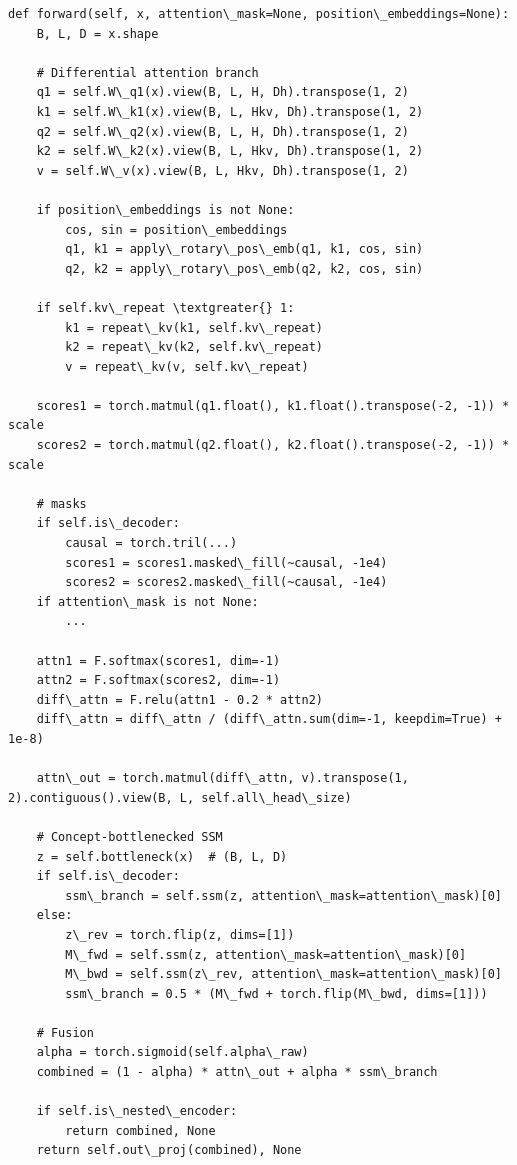 \begin{lstlisting}
def forward(self, x, attention\_mask=None, position\_embeddings=None):
    B, L, D = x.shape
    
    # Differential attention branch
    q1 = self.W\_q1(x).view(B, L, H, Dh).transpose(1, 2)
    k1 = self.W\_k1(x).view(B, L, Hkv, Dh).transpose(1, 2)
    q2 = self.W\_q2(x).view(B, L, H, Dh).transpose(1, 2)
    k2 = self.W\_k2(x).view(B, L, Hkv, Dh).transpose(1, 2)
    v = self.W\_v(x).view(B, L, Hkv, Dh).transpose(1, 2)
    
    if position\_embeddings is not None:
        cos, sin = position\_embeddings
        q1, k1 = apply\_rotary\_pos\_emb(q1, k1, cos, sin)
        q2, k2 = apply\_rotary\_pos\_emb(q2, k2, cos, sin)
    
    if self.kv\_repeat \textgreater{} 1:
        k1 = repeat\_kv(k1, self.kv\_repeat)
        k2 = repeat\_kv(k2, self.kv\_repeat)
        v = repeat\_kv(v, self.kv\_repeat)
    
    scores1 = torch.matmul(q1.float(), k1.float().transpose(-2, -1)) * scale
    scores2 = torch.matmul(q2.float(), k2.float().transpose(-2, -1)) * scale
    
    # masks
    if self.is\_decoder:
        causal = torch.tril(...)
        scores1 = scores1.masked\_fill(~causal, -1e4)
        scores2 = scores2.masked\_fill(~causal, -1e4)
    if attention\_mask is not None:
        ...
    
    attn1 = F.softmax(scores1, dim=-1)
    attn2 = F.softmax(scores2, dim=-1)
    diff\_attn = F.relu(attn1 - 0.2 * attn2)
    diff\_attn = diff\_attn / (diff\_attn.sum(dim=-1, keepdim=True) + 1e-8)
    
    attn\_out = torch.matmul(diff\_attn, v).transpose(1, 2).contiguous().view(B, L, self.all\_head\_size)
    
    # Concept-bottlenecked SSM
    z = self.bottleneck(x)  # (B, L, D)
    if self.is\_decoder:
        ssm\_branch = self.ssm(z, attention\_mask=attention\_mask)[0]
    else:
        z\_rev = torch.flip(z, dims=[1])
        M\_fwd = self.ssm(z, attention\_mask=attention\_mask)[0]
        M\_bwd = self.ssm(z\_rev, attention\_mask=attention\_mask)[0]
        ssm\_branch = 0.5 * (M\_fwd + torch.flip(M\_bwd, dims=[1]))
    
    # Fusion
    alpha = torch.sigmoid(self.alpha\_raw)
    combined = (1 - alpha) * attn\_out + alpha * ssm\_branch
    
    if self.is\_nested\_encoder:
        return combined, None
    return self.out\_proj(combined), None
\end{lstlisting}

